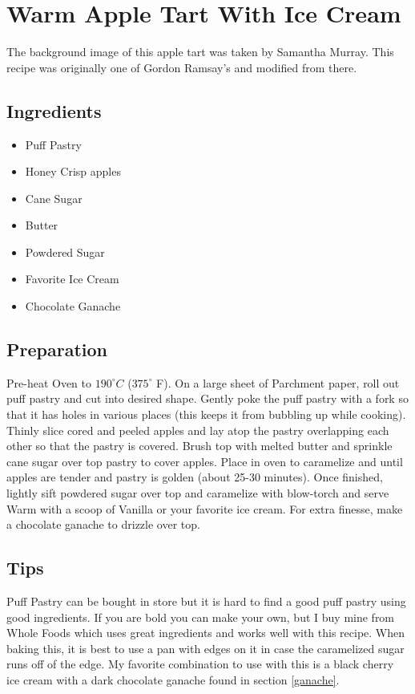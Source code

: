 \thispagestyle{fancy}
\section{Warm Apple Tart With Ice Cream} \label{appletart}
\AddToShipoutPicture*{\AppleTart}

The background image of this apple tart was taken by Samantha Murray. This recipe was originally one of Gordon Ramsay's and modified from there.

\subsection*{Ingredients}
\begin{multicols}{3}
	\begin{itemize}
		\item Puff Pastry
		\item Honey Crisp apples
		\item Cane Sugar
		\item Butter
		\item Powdered Sugar
		\item Favorite Ice Cream
		\item Chocolate Ganache
	\end{itemize}
\end{multicols}

\subsection*{Preparation}

Pre-heat Oven to $190^\circ C$ ($375^\circ$ F). On a large sheet of Parchment paper, roll out puff pastry and cut into desired shape. Gently poke the puff pastry with a fork so that it has holes in various places (this keeps it from bubbling up while cooking). Thinly slice cored and peeled apples and lay atop the pastry overlapping each other so that the pastry is covered. Brush top with melted butter and sprinkle cane sugar over top pastry to cover apples. Place in oven to caramelize and until apples are tender and pastry is golden (about 25-30 minutes). Once finished, lightly sift powdered sugar over top and caramelize with blow-torch and serve Warm with a scoop of Vanilla or your favorite ice cream. For extra finesse, make a chocolate ganache to drizzle over top.

\subsection*{Tips}

Puff Pastry can be bought in store but it is hard to find a good puff pastry using good ingredients. If you are bold you can make your own, but I buy mine from Whole Foods which uses great ingredients and works well with this recipe. When baking this, it is best to use a pan with edges on it in case the caramelized sugar runs off of the edge. My favorite combination to use with this is a black cherry ice cream with a dark chocolate ganache found in section \ref{ganache}.